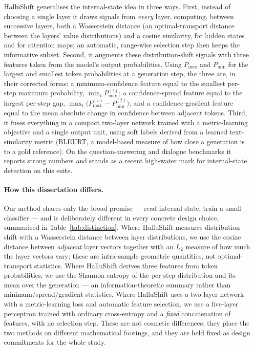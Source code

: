 HalluShift generalises the internal-state idea in three ways. First, instead of choosing
a single layer it draws signals from \emph{every} layer, computing, between successive
layers, both a Wasserstein distance (an optimal-transport distance between the layers'
value distributions) and a cosine similarity, for hidden states and for attention maps;
an automatic, range-wise selection step then keeps the informative subset. Second, it
augments these distribution-shift signals with three features taken from the model's
output probabilities. Using $P_{\max}$ and $P_{\min}$ for the largest and smallest
token probabilities at a generation step, the three are, in their corrected forms: a
minimum-confidence feature equal to the smallest per-step maximum probability,
$\min_t P_{\max}^{(t)}$; a confidence-spread feature equal to the largest per-step gap,
$\max_t\!\big(P_{\max}^{(t)} - P_{\min}^{(t)}\big)$; and a confidence-gradient feature
equal to the mean absolute change in confidence between adjacent tokens. Third, it fuses
everything in a compact two-layer network trained with a metric-learning objective and a
single output unit, using soft labels derived from a learned text-similarity metric
(BLEURT, a model-based measure of how close a generation is to a gold reference). On the
question-answering and dialogue benchmarks it reports strong numbers and stands as a
recent high-water mark for internal-state detection on this suite.

\paragraph{How this dissertation differs.}
Our method shares only the broad premise --- read internal state, train a small
classifier --- and is deliberately different in every concrete design choice, summarised
in Table~\ref{tab:distinction}. Where HalluShift measures distribution shift with a
Wasserstein distance between layer distributions, we use the cosine distance between
\emph{adjacent} layer vectors together with an $L_2$ measure of how much the layer
vectors vary; these are intra-sample geometric quantities, not optimal-transport
statistics. Where HalluShift derives three features from token probabilities, we use the
Shannon entropy of the per-step distribution and its mean over the generation --- an
information-theoretic summary rather than minimum/spread/gradient statistics. Where
HalluShift uses a two-layer network with a metric-learning loss and automatic feature
selection, we use a five-layer perceptron trained with ordinary cross-entropy and a
\emph{fixed} concatenation of features, with no selection step. These are not cosmetic
differences: they place the two methods on different mathematical footings, and they are
held fixed as design commitments for the whole study.

